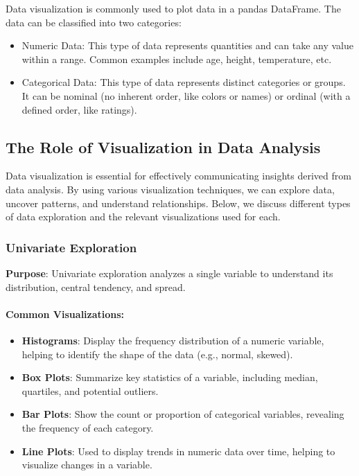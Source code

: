 \documentclass[
  letterpaper,
  DIV=11,
  numbers=noendperiod]{scrreprt}
\let\oldparagraph\paragraph
\renewcommand{\paragraph}[1]{\oldparagraph{#1}\mbox{}}
\providecommand{\tightlist}{%
  \setlength{\itemsep}{0pt}\setlength{\parskip}{0pt}}\usepackage{longtable,booktabs,array}
\begin{document}
Data visualization is commonly used to plot data in a pandas DataFrame.
The data can be classified into two categories:

\begin{itemize}
\item
  Numeric Data: This type of data represents quantities and can take any
  value within a range. Common examples include age, height,
  temperature, etc.
\item
  Categorical Data: This type of data represents distinct categories or
  groups. It can be nominal (no inherent order, like colors or names) or
  ordinal (with a defined order, like ratings).
\end{itemize}

\hypertarget{the-role-of-visualization-in-data-analysis}{%
\subsection{The Role of Visualization in Data
Analysis}\label{the-role-of-visualization-in-data-analysis}}

Data visualization is essential for effectively communicating insights
derived from data analysis. By using various visualization techniques,
we can explore data, uncover patterns, and understand relationships.
Below, we discuss different types of data exploration and the relevant
visualizations used for each.

\hypertarget{univariate-exploration}{%
\subsubsection{Univariate Exploration}\label{univariate-exploration}}

\textbf{Purpose}: Univariate exploration analyzes a single variable to
understand its distribution, central tendency, and spread.

\hypertarget{common-visualizations}{%
\paragraph{Common Visualizations:}\label{common-visualizations}}

\begin{itemize}
\tightlist
\item
  \textbf{Histograms}: Display the frequency distribution of a numeric
  variable, helping to identify the shape of the data (e.g., normal,
  skewed).
\item
  \textbf{Box Plots}: Summarize key statistics of a variable, including
  median, quartiles, and potential outliers.
\item
  \textbf{Bar Plots}: Show the count or proportion of categorical
  variables, revealing the frequency of each category.
\item
  \textbf{Line Plots}: Used to display trends in numeric data over time,
  helping to visualize changes in a variable.
\end{itemize}
\end{document}
